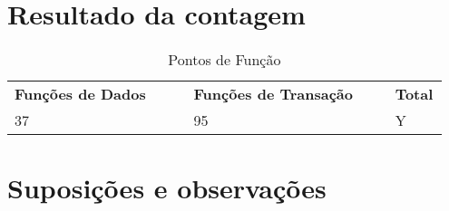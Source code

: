 \vfill
\pagebreak
\section{Resultado da contagem}

\begin{table*}[!h]
\centering
\caption{Pontos de Função}
\label{resultado_contagem}
  \begin{tabular}{|p{0.40\linewidth}|p{0.45\linewidth}|p{0.10\linewidth}|}
  \hline
  \textbf{Funções de Dados} & \textbf{Funções de Transação} & \textbf{Total} \\ 
  37 & 95 & Y\\
  \hline
 
  \end{tabular}
\end{table*}

\section{Suposições e observações}

